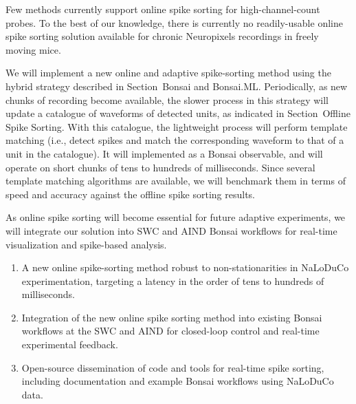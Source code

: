 Few methods currently support online spike sorting for high-channel-count
probes. To the best of our knowledge, there is currently no readily-usable
online spike sorting solution available for chronic Neuropixels recordings in
freely moving mice.

We will implement a new online and adaptive spike-sorting method using the
hybrid strategy described in Section~Bonsai and Bonsai.ML.
%
Periodically, as new chunks of recording become available, the slower process
in this strategy will update a catalogue of waveforms of detected units, as
indicated in Section~Offline Spike Sorting.
%
With this catalogue, the lightweight process will perform template matching
(i.e., detect spikes and match the corresponding waveform to that of a unit in
the catalogue).
%
It will implemented as a Bonsai observable, and will operate on short chunks
of tens to hundreds of milliseconds.
%
Since several template matching algorithms are available, we will benchmark
them in terms of speed and accuracy against the offline spike sorting results.

As online spike sorting will become essential for future adaptive experiments,
we will integrate our solution into SWC and AIND Bonsai workflows for
real-time visualization and spike-based analysis.


\begin{enumerate}

    \item A new online spike-sorting method robust to non-stationarities in
        NaLoDuCo experimentation, targeting a latency in the order of tens to
        hundreds of milliseconds.

    \item Integration of the new online spike sorting method into existing
        Bonsai workflows at the SWC and AIND for closed-loop control and
        real-time experimental feedback.

    \item Open-source dissemination of code and tools for real-time spike
        sorting, including documentation and example Bonsai workflows using
        NaLoDuCo data.

\end{enumerate}

